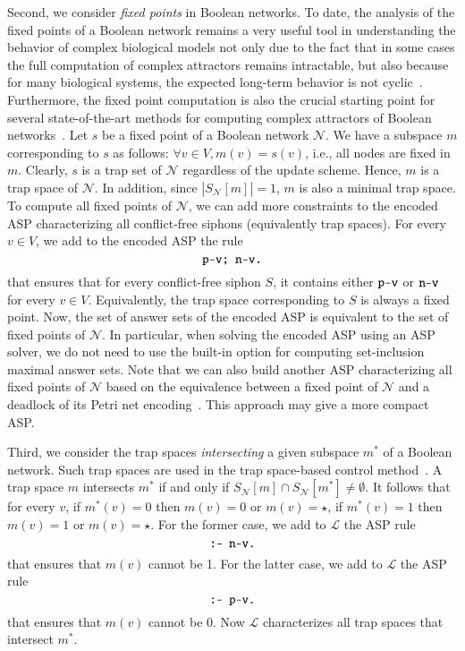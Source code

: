 \documentclass[preprint,12pt]{elsarticle}
\begin{document}
Second, we consider \emph{fixed points} in Boolean networks.
To date, the analysis of the fixed points of a Boolean network remains
a very useful tool in understanding the behavior of complex biological models not only due to the fact that in some cases the full computation of complex attractors remains intractable, but also because for many biological systems, the expected long-term behavior is not cyclic~\cite{corral2021interplay}.
Furthermore, the fixed point computation is also the crucial starting point for several state-of-the-art methods for computing complex attractors of Boolean networks~\cite{DBLP:conf/bcb/TrinhHB22}.
Let \(s\) be a fixed point of a Boolean network \(\mathcal{N}\).
We have a subspace \(m\) corresponding to \(s\) as follows: \(\forall v \in V, m(v) = s(v)\), i.e., all nodes are fixed in \(m\).
Clearly, \(s\) is a trap set of \(\mathcal{N}\) regardless of the update scheme.
Hence, \(m\) is a trap space of \(\mathcal{N}\).
In addition, since \(\left\vert S_{\mathcal{N}}[m]\right\vert = 1\), \(m\) is also a minimal trap space.
To compute all fixed points of \(\mathcal{N}\), we can add more constraints to the encoded ASP characterizing all conflict-free siphons (equivalently trap spaces).
For every \(v \in V\), we add to the encoded ASP the rule
\[
  \verb|p-v; n-v.|
\]
that ensures that for every conflict-free siphon \(S\), it contains either \(\verb|p-v|\) or \(\verb|n-v|\) for every \(v \in V\).
Equivalently, the trap space corresponding to \(S\) is always a fixed point.
Now, the set of answer sets of the encoded ASP is equivalent to the set of fixed points of \(\mathcal{N}\).
In particular, when solving the encoded ASP using an ASP solver, we do not need to use the built-in option for computing set-inclusion maximal answer sets.
Note that we can also build another ASP characterizing all fixed points of \(\mathcal{N}\) based on the equivalence between a fixed point of \(\mathcal{N}\) and a deadlock of its Petri net encoding~\cite{chatain2014characterization}.
This approach may give a more compact ASP\@.

Third, we consider the trap spaces \emph{intersecting} a given subspace \(m^{*}\) of a Boolean network.
Such trap spaces are used in the trap space-based control method~\cite{cifuentes2020control}.
A trap space \(m\) intersects \(m^{*}\) if and only if \(S_{\mathcal{N}}[m] \cap S_{\mathcal{N}}[m^{*}] \neq \emptyset\).
It follows that for every \(v\), if \(m^{*}(v) = 0\) then \(m(v) = 0\) or \(m(v) = \star\), if \(m^{*}(v) = 1\) then \(m(v) = 1\) or \(m(v) = \star\).
For the former case, we add to \(\mathcal{L}\) the ASP rule
\[
  \verb|:- n-v.|
\]
that ensures that \(m(v)\) cannot be 1.
For the latter case, we add to \(\mathcal{L}\) the ASP rule
\[
  \verb|:- p-v.|
\]
that ensures that \(m(v)\) cannot be 0.
Now \(\mathcal{L}\) characterizes all trap spaces that intersect \(m^{*}\).
\end{document}
